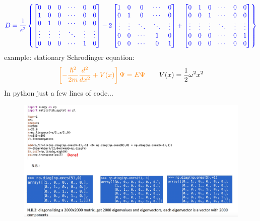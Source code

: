 \documentclass{article}
\begin{document}
\begin{equation}
    \textcolor{blue}{
D = \frac{1}{\epsilon^2}
\left\{
\begin{bmatrix}
0 & 0 & 0 & \cdots & 0 & 0 \\
1 & 0 & 0 & \cdots & 0 & 0 \\
0 & 1 & 0 & \cdots & 0 & 0 \\
\vdots & \vdots & \vdots & \ddots & \vdots & \vdots \\
0 & 0 & 0 & \cdots & 1 & 0
\end{bmatrix}
- 2
\begin{bmatrix}
1 & 0 & 0 & \cdots & 0 \\
0 & 1 & 0 & \cdots & 0 \\
\vdots & \vdots & \ddots & \ddots & \vdots \\
0 & 0 & \cdots & 1 & 0 \\
0 & 0 & \cdots & 0 & 1
\end{bmatrix}
+
\begin{bmatrix}
0 & 1 & 0 & \cdots & 0 & 0 \\
0 & 0 & 1 & \cdots & 0 & 0 \\
\vdots & \vdots & \vdots & \ddots & \vdots & \vdots \\
0 & 0 & 0 & \cdots & 0 & 1 \\
0 & 0 & 0 & \cdots & 0 & 0
\end{bmatrix}
\right\}
}
\end{equation}
example: stationary Schrodinger equation:
\begin{equation}
    \textcolor{orange}{
\left[
-\frac{\hbar^2}{2m} \frac{d^2}{dx^2} + V(x)
\right] \Psi = E \Psi
}
\qquad
V(x) = \frac{1}{2} \omega^2 x^2
\end{equation}
In python just a few lines of code...
\begin{figure}[h]
    \centering
    \includegraphics[width=1\linewidth]{fig6.png}
\end{figure}
\newpage
\end{document}
